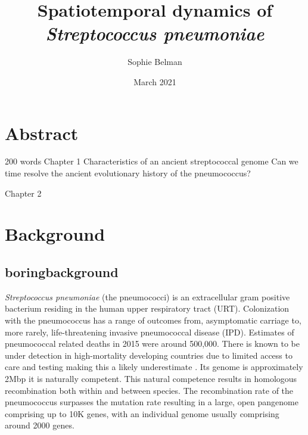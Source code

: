\documentclass{article}
\title{Spatiotemporal dynamics of \textit{Streptococcus pneumoniae}}
\author{Sophie Belman}
\date{March 2021}
\begin{document}
\maketitle

\section{Abstract}
200 words
Chapter 1
Characteristics of an ancient streptococcal genome
Can we time resolve the ancient evolutionary history of the pneumococcus?

Chapter 2

\section{Background}
\subsection{boringbackground} \textit{Streptococcus pneumoniae} (the pneumococci) is an extracellular gram positive bacterium residing in the human upper respiratory tract (URT). Colonization with the pneumococcus has a range of outcomes from, asymptomatic carriage to, more rarely, life-threatening invasive pneumococcal disease (IPD)\cite{weiserStreptococcusPneumoniaeTransmission2018}. Estimates of pneumococcal related deaths in 2015 were around 500,000\cite{wahlBurdenStreptococcusPneumoniae2018}. There is known to be under detection in high-mortality developing countries due to limited access to care and testing making this a likely underestimate \cite{obrienBurdenDiseaseCaused2009,troegerEstimatesGlobalRegional2017}. Its genome is approximately 2Mbp it is naturally competent. This natural competence results in homologous recombination both within and between species. The recombination rate of the pneumococcus surpasses the mutation rate resulting in a large, open pangenome comprising up to 10K genes, with an individual genome usually comprising around 2000 genes.  
\end{document}
